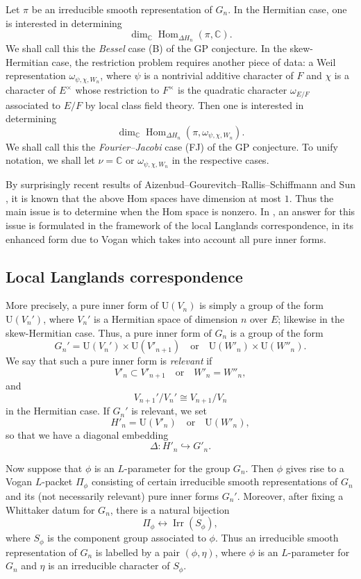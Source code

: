 \documentclass[11pt]{amsart}
\numberwithin{equation}{section}
\theoremstyle{plain}
\theoremstyle{definition}
\theoremstyle{remark}
\def\Hom{\operatorname{Hom}}
\def\Irr{\operatorname{Irr}}
\def\U{\mathrm{U}}
\def\CC{\mathbb{C}}
\begin{document}
Let $\pi$ be an irreducible smooth representation of $G_n$. In the Hermitian case, one is interested in determining 
\[  \dim_\CC \Hom_{\Delta H_n} ( \pi, \CC). \]
We shall call this the \emph{Bessel} case (B) of the GP conjecture.
In the skew-Hermitian case, the restriction problem requires another piece of data: a Weil representation $\omega_{\psi, \chi, W_n}$, where $\psi$ is a nontrivial additive character of $F$ and $\chi$ is a character of $E^{\times}$ whose restriction to $F^{\times}$ is the quadratic character $\omega_{E/F}$ associated to $E/F$ by local class field theory.
Then  one is interested in determining
\[  \dim_\CC \Hom_{\Delta H_n} ( \pi, \omega_{\psi,\chi, W_n}). \]
We shall call this the \emph{Fourier--Jacobi} case (FJ) of the GP conjecture. To unify notation, we shall let $\nu = \CC$ or $\omega_{\psi,\chi, W_n}$ in the respective cases.

By surprisingly recent results of Aizenbud--Gourevitch--Rallis--Schiffmann \cite{agrs} and Sun \cite{sun}, it is known that the above Hom spaces have dimension at most $1$. Thus the main issue is to determine when the Hom space is nonzero. 
In \cite{ggp1}, an answer for this issue is formulated  in the framework of the local Langlands correspondence,  in its enhanced form due to Vogan \cite{v} which takes into account all pure inner forms.  

\subsection{Local Langlands correspondence}

More precisely, a pure inner form of $\U(V_n)$ is simply a group of the form $\U(V_n')$, where $V_n'$ is a  Hermitian space of dimension $n$ over $E$; likewise in the skew-Hermitian case.  
Thus, a pure inner form of $G_n$ is a group of the form
\[  G_n' = \U(V_n') \times \U(V'_{n+1}) \quad \text{or} \quad \U(W'_n) \times \U(W''_n). \]
We say that such a pure inner form is \emph{relevant} if
\[  V'_n \subset V'_{n+1} \quad \text{or} \quad   W'_n = W''_n, \] 
and 
\[   V_{n+1}'/V_{n}' \cong V_{n+1}/V_{n} \]
in the Hermitian case.
If $G_n'$ is relevant, we set
\[   H'_n = \U(V'_n) \quad \text{or} \quad \U(W'_n), \]
so that we have a diagonal embedding
\[ \Delta:  H'_n \hookrightarrow G'_n. \]

Now suppose that $\phi$ is an $L$-parameter for the group $G_n$.
Then $\phi$ gives rise to a Vogan $L$-packet $\Pi_{\phi}$ consisting of certain irreducible smooth representations of $G_n$ and its (not necessarily relevant) pure inner forms $G_n'$.
Moreover, after fixing a Whittaker datum for $G_n$, there is a natural bijection
\[  \Pi_{\phi} \longleftrightarrow \Irr(S_{\phi}), \]
where  $S_{\phi}$ is the component group associated to $\phi$. 
Thus an irreducible smooth representation of $G_n$ is labelled by a pair $(\phi, \eta)$, where $\phi$ is an $L$-parameter for $G_n$ and $\eta$ is an irreducible character of $S_{\phi}$. 
\end{document}
